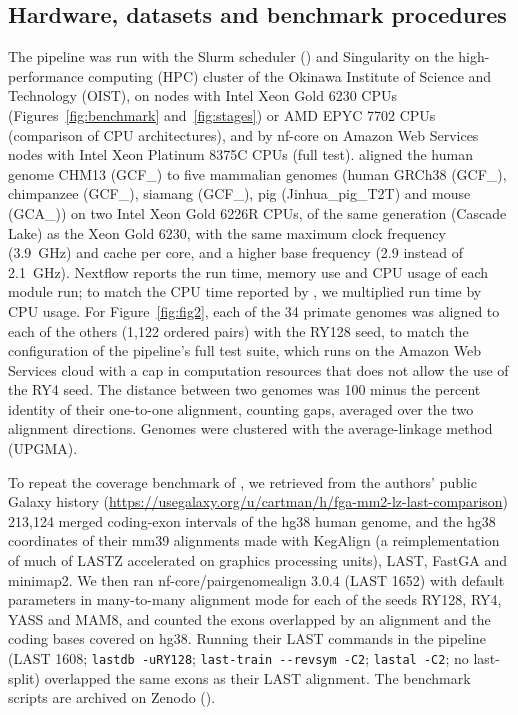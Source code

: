 \documentclass[PCJ,Unicode,screen]{cedram}
\begin{document}
\subsection*{Hardware, datasets and benchmark procedures}

The pipeline was run with the Slurm scheduler (\cite{Jette_2023}) and Singularity on the high-performance computing (HPC) cluster of the Okinawa Institute of Science and Technology (OIST), on nodes with Intel Xeon Gold 6230 CPUs (Figures~\ref{fig:benchmark} and~\ref{fig:stages}) or AMD EPYC 7702 CPUs (comparison of CPU architectures), and by nf-core on Amazon Web Services nodes with Intel Xeon Platinum 8375C CPUs (full test). \citet{Myers_2025} aligned the human genome CHM13 (GCF\_) to five mammalian genomes (human GRCh38 (GCF\_), chimpanzee (GCF\_), siamang (GCF\_), pig (Jinhua\_\allowbreak pig\_\allowbreak T2T) and mouse (GCA\_)) on two Intel Xeon Gold 6226R CPUs, of the same generation (Cascade Lake) as the Xeon Gold 6230, with the same maximum clock frequency (3.9~GHz) and cache per core, and a higher base frequency (2.9 instead of 2.1~GHz). Nextflow reports the run time, memory use and CPU usage of each module run; to match the CPU time reported by \citet{Myers_2025}, we multiplied run time by CPU usage. For Figure~\ref{fig:fig2}, each of the 34 primate genomes was aligned to each of the others (1,122 ordered pairs) with the RY128 seed, to match the configuration of the pipeline's full test suite, which runs on the Amazon Web Services cloud with a cap in computation resources that does not allow the use of the RY4 seed. The distance between two genomes was 100 minus the percent identity of their one-to-one alignment, counting gaps, averaged over the two alignment directions. Genomes were clustered with the  average-linkage method (UPGMA).

To repeat the coverage benchmark of \citet{Gulhan_2025}, we retrieved from the authors' public Galaxy history (\url{https://usegalaxy.org/u/cartman/h/fga-mm2-lz-last-comparison}) 213,124 merged coding-exon intervals of the hg38 human genome, and the hg38 coordinates of their mm39 alignments made with KegAlign (a reimplementation of much of LASTZ accelerated on graphics processing units), LAST, FastGA and minimap2. We then ran nf-core/pairgenomealign 3.0.4 (LAST 1652) with default parameters in many-to-many alignment mode for each of the seeds RY128, RY4, YASS and MAM8, and counted the exons overlapped by an alignment and the coding bases covered on hg38. Running their LAST commands in the pipeline (LAST 1608; \texttt{lastdb -uRY128}; \texttt{last-train -{}-revsym -C2}; \texttt{lastal -C2}; no last-split) overlapped the same exons as their LAST alignment. The benchmark scripts are archived on Zenodo (\cite{pairgenomealign_paper_data}).
\end{document}
